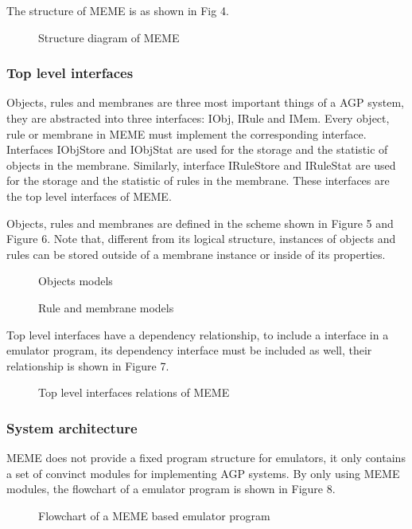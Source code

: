 \documentclass[9pt,a4paper,twoside]{article}
\newcommand\figpath{./paper/assets/figures/}
\begin{document}
    The structure of MEME is as shown in Fig 4. 
    \begin{figure}[!htbp]
        \centering
        
        \caption{Structure diagram of MEME}
        \label{fig:fig4}
    \end{figure}

        \subsubsection{Top level interfaces}
        Objects, rules and membranes are three most important things of a AGP system, they are abstracted into three interfaces: IObj, IRule and IMem.
        Every object, rule or membrane in MEME must implement the corresponding interface.
        Interfaces IObjStore and IObjStat are used for the storage and the statistic of objects in the membrane. 
        Similarly, interface IRuleStore and IRuleStat are used for the storage and the statistic of rules in the membrane. 
        These interfaces are the top level interfaces of MEME.

        Objects, rules and membranes are defined in the scheme shown in Figure 5 and Figure 6. Note that, different from its logical structure, instances of objects and rules 
        can be stored outside of a membrane instance or inside of its properties.
        \begin{figure}[!htbp]
            \centering
            
            \caption{Objects models}
            \label{fig:fig5}
        \end{figure}
        \begin{figure}[!htbp]
            \centering
            
            \caption{Rule and membrane models}
            \label{fig:fig6}
        \end{figure}

        Top level interfaces have a dependency relationship, to include a interface in a emulator program, its dependency interface must be included as well,
        their relationship is shown in Figure 7.
        \begin{figure}[!htbp]
            \centering
            
            \caption{Top level interfaces relations of MEME}
            \label{fig:fig7}
        \end{figure}
    
        \subsubsection{System architecture}
        MEME does not provide a fixed program structure for emulators, it only contains a set of convinct modules for implementing AGP systems.
        By only using MEME modules, the flowchart of a emulator program is shown in Figure 8.
        \begin{figure}[!htbp]
            \centering
            
            \caption{Flowchart of a MEME based emulator program}
            \label{fig:fig8}
        \end{figure}
\end{document}

